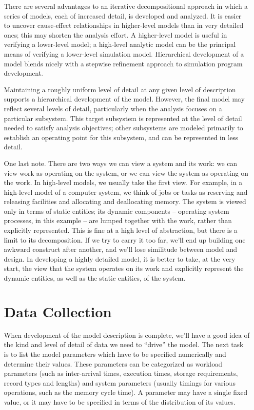 There are several advantages to an iterative decompositional approach in which
a series of models, each of increased detail, is developed and analyzed. It is
easier to uncover cause-effect relationships in higher-level models than in
very detailed ones; this may shorten the analysis effort. A higher-level model
is useful in verifying a lower-level model; a high-level analytic model can be
the principal means of verifying a lower-level simulation model. Hierarchical
development of a model blends nicely with a stepwise refinement approach to
simulation program development.

Maintaining a roughly uniform level of detail at any given level of
description supports a hierarchical development of the model. However, the
final model may reflect several levels of detail, particularly when the
analysis focuses on a particular subsystem. This target subsystem is
represented at the level of detail needed to satisfy analysis objectives; other
subsystems are modeled primarily to establish an operating point for this
subsystem, and can be represented in less detail.

One last note. There are two ways we can view a system and its work: we can
view work as operating on the system, or we can view the system as operating
on the work. In high-level models, we usually take the first view. For
example, in a high-level model of a computer system, we think of jobs or tasks
as reserving and releasing facilities and allocating and deallocating memory.
The system is viewed only in terms of static entities; its dynamic components
-- operating system processes, in this example -- are lumped together with the
work, rather than explicitly represented. This is fine at a high level of
abstraction, but there is a limit to its decomposition. If we try to carry it
too far, we'll end up building one awkward construct after another, and we'll
lose similitude between model and design. In developing a highly detailed
model, it is better to take, at the very start, the view that the system
operates on its work and explicitly represent the dynamic entities, as well as
 the static entities, of the system.

\section{Data Collection}
\label{sec:data-collection}

When development of the model description is complete, we'll have a good idea
of the kind and level of detail of data we need to ``drive'' the model. The
next task is to list the model parameters which have to be specified
numerically and determine their values. These parameters can be categorized
as workload parameters (such as inter-arrival times, execution times, storage
requirements, record types and lengths) and system parameters (usually timings
for various operations, such as the memory cycle time). A parameter may have
a single fixed value, or it may have to be specified in terms of the
 distribution of its values.

